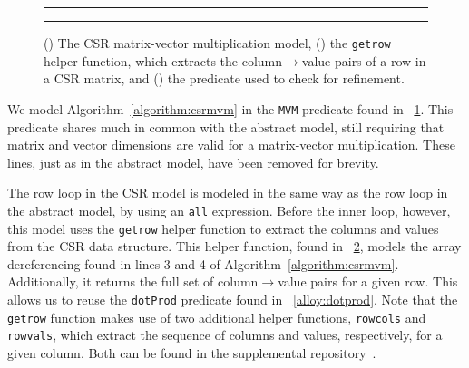 \begin{figure}
\begin{subfigure}[b]{0.5\textwidth}
  \centering
  
  \caption{}
  \label{alloy:mvmcsr}
\end{subfigure}
{\color{lightgray}\rule{0.4\textwidth}{0.1pt}}
\par\bigskip
\begin{subfigure}[b]{0.5\textwidth}
  \centering
  
  \caption{}
  \label{alloy:getrow}
\end{subfigure}
{\color{lightgray}\rule{0.4\textwidth}{0.1pt}}
\par\bigskip
\begin{subfigure}[b]{0.5\textwidth}
  \centering
  
  \caption{}
  \label{alloy:mvmcsrref}
\end{subfigure}
\caption{() The CSR matrix-vector multiplication model, () the \texttt{getrow} helper function, which extracts the column$\rightarrow$value pairs of a row in a CSR matrix, and () the predicate used to check for refinement.}
\end{figure}

We model Algorithm~\ref{algorithm:csrmvm} in the \texttt{MVM} predicate found in \figurename~\ref{alloy:mvmcsr}.  This predicate shares much in common with the abstract model, still requiring that matrix and vector dimensions are valid for a matrix-vector multiplication.  These lines, just as in the abstract model, have been removed for brevity.

The row loop in the CSR model is modeled in the same way as the row loop in the abstract model, by using an \texttt{all} expression.  Before the inner loop, however, this model uses the \texttt{getrow} helper function to extract the columns and values from the CSR data structure.  This helper function, found in \figurename~\ref{alloy:getrow}, models the array dereferencing found in lines 3 and 4 of Algorithm~\ref{algorithm:csrmvm}.  Additionally, it returns the full set of column$\rightarrow$value pairs for a given row.  This allows us to reuse the \texttt{dotProd} predicate found in \figurename~\ref{alloy:dotprod}.  Note that the \texttt{getrow} function makes use of two additional helper functions, \texttt{rowcols} and \texttt{rowvals}, which extract the sequence of columns and values, respectively, for a given column.  Both can be found in the supplemental repository~\cite{repository}.


